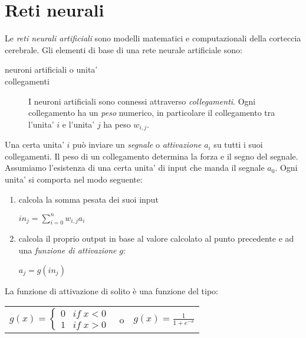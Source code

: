 \section{Reti neurali}
\label{retineurali}
Le \emph{reti neurali artificiali} sono modelli matematici e computazionali della corteccia cerebrale. 
Gli elementi di base di una rete neurale artificiale sono:
\begin{description}
  \item[neuroni artificiali o unita']
  \item[collegamenti]
    I neuroni artificiali sono connessi attraverso \emph{collegamenti}. 
    Ogni collegamento ha un \emph{peso} numerico, in particolare il collegamento tra l'unita' $i$ e l'unita' $j$ ha peso $w_{i,j}$. 
\end{description}
Una certa unita' $i$ pu\`o inviare un \emph{segnale} o \emph{attivazione} $a_{i}$ su tutti i suoi collegamenti. 
Il peso di un collegamento determina la forza e il segno del segnale. 
Assumiamo l'esistenza di una certa unita' di input che manda il segnale $a_{0}$. 
Ogni unita' si comporta nel modo seguente:
\begin{enumerate}
  \item 
    calcola la somma pesata dei suoi input
    \begin{center}
      $in_{j} = \sum\limits_{i=0}^n w_{i,j} a_{i}$
    \end{center}
  \item
    calcola il proprio output in base al valore calcolato al punto precedente e ad una \emph{funzione di attivazione} $g$: 
    \begin{center}    
      $a_{j}=g(in_{j})$
    \end{center}    
\end{enumerate}
La funzione di attivazione di solito \`e una funzione del tipo:
\begin{center}
  \begin{tabular}{lll}
      $g(x)= \left\{ 
	  \begin{array}{ll}
	      0
	    &
	      if\; x< 0
	    \\
	      1
	    &
	      if\; x> 0
	  \end{array}
      \right.$
    &
      o
    &
      $g(x)= \frac{1}{1+e^{-x}}$
  \end{tabular}
\end{center}


